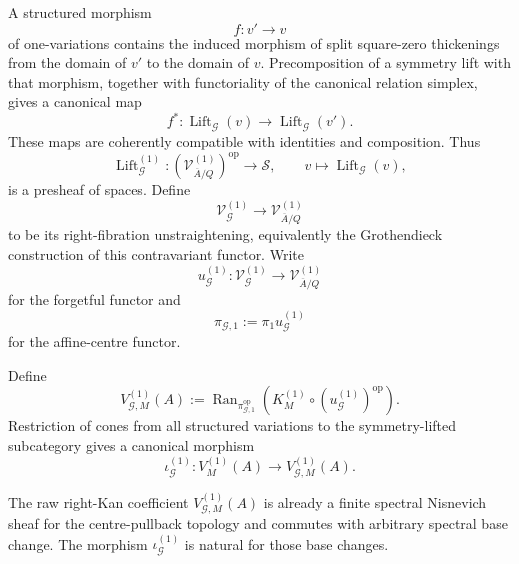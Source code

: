 \begin{definition}
\label{def:symmetry-noether-symmetry-one-variation-category}
A structured morphism
\[
f:v'\longrightarrow v
\]
of one-variations contains the induced morphism of split square-zero thickenings
from the domain of $v'$ to the domain of $v$.  Precomposition of a symmetry lift
with that morphism, together with functoriality of the canonical relation simplex,
gives a canonical map
\[
f^*:
\operatorname{Lift}_{\mathcal G}(v)
\longrightarrow
\operatorname{Lift}_{\mathcal G}(v').
\]
These maps are coherently compatible with identities and composition.  Thus
\[
\operatorname{Lift}_{\mathcal G}^{(1)}:
\left(\mathcal V_{\overline A/Q}^{(1)}\right)^{\mathrm{op}}
\longrightarrow
\mathcal S,
\qquad
v\longmapsto\operatorname{Lift}_{\mathcal G}(v),
\]
is a presheaf of spaces.  Define
\[
\mathcal V_{\mathcal G}^{(1)}
\longrightarrow
\mathcal V_{\overline A/Q}^{(1)}
\]
to be its right-fibration unstraightening, equivalently the Grothendieck
construction of this contravariant functor.  Write
\[
u_{\mathcal G}^{(1)}:
\mathcal V_{\mathcal G}^{(1)}
\longrightarrow
\mathcal V_{\overline A/Q}^{(1)}
\]
for the forgetful functor and
\[
\pi_{\mathcal G,1}:=
\pi_1u_{\mathcal G}^{(1)}
\]
for the affine-centre functor.
\end{definition}

\begin{construction}
\label{constr:symmetry-noether-symmetry-first-variation-coefficient}
Define
\[
V_{\mathcal G,M}^{(1)}(A)
:=
\operatorname{Ran}_{\pi_{\mathcal G,1}^{\mathrm{op}}}
\left(
K_M^{(1)}
\circ
(u_{\mathcal G}^{(1)})^{\mathrm{op}}
\right).
\]
Restriction of cones from all structured variations to the symmetry-lifted subcategory
gives a canonical morphism
\[
\boxed{
\iota_{\mathcal G}^{(1)}:
V_M^{(1)}(A)
\longrightarrow
V_{\mathcal G,M}^{(1)}(A).
}
\]
\end{construction}

\begin{theorem}
\label{thm:symmetry-noether-symmetry-first-difference-descent-and-raw-base-change}
The raw right-Kan coefficient
$V_{\mathcal G,M}^{(1)}(A)$ is already a finite spectral Nisnevich sheaf for the
centre-pullback topology and commutes with arbitrary spectral base change.
The morphism $\iota_{\mathcal G}^{(1)}$ is natural for those base changes.
\end{theorem}

